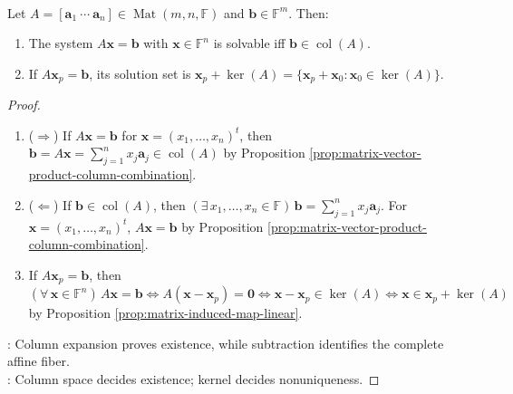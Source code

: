 \begin{proposition} \label{prop:linear-system-solvability-and-affine-solution-set} \\
Let $A=[\mathbf{a}_1\ \cdots\ \mathbf{a}_n]\in\operatorname{Mat}(m,n,\mathbb{F})$ and $\mathbf{b}\in\mathbb{F}^m$. Then:
\begin{enumerate}[label=(\roman*)]
\setlength{\itemsep}{0pt}
\item The system $A\mathbf{x}=\mathbf{b}$ with $\mathbf{x}\in\mathbb{F}^n$ is solvable iff $\mathbf{b}\in\operatorname{col}(A)$.
\item If $A\mathbf{x}_p=\mathbf{b}$, its solution set is $\mathbf{x}_p+\ker(A)=\{\mathbf{x}_p+\mathbf{x}_0:\mathbf{x}_0\in\ker(A)\}$.
\end{enumerate}
\begin{proof}
\begin{enumerate}[label=(\roman*)]
\setlength{\itemsep}{0pt}
\item[$(i)$] ($\Rightarrow$) If $A\mathbf{x}=\mathbf{b}$ for $\mathbf{x}=(x_1,\ldots,x_n)^t$, then $\mathbf{b}=A\mathbf{x}=\sum\limits_{j=1}^{n}x_j\mathbf{a}_j\in\operatorname{col}(A)$ by Proposition \ref{prop:matrix-vector-product-column-combination}.
\item[$(i)$] ($\Leftarrow$) If $\mathbf{b}\in\operatorname{col}(A)$, then $(\exists\,x_1,\ldots,x_n\in\mathbb{F})\,\mathbf{b}=\sum\limits_{j=1}^{n}x_j\mathbf{a}_j$. For $\mathbf{x}=(x_1,\ldots,x_n)^t$, $A\mathbf{x}=\mathbf{b}$ by Proposition \ref{prop:matrix-vector-product-column-combination}.
\item[$(ii)$] If $A\mathbf{x}_p=\mathbf{b}$, then $(\forall\,\mathbf{x}\in\mathbb{F}^n)\,A\mathbf{x}=\mathbf{b}\iff A(\mathbf{x}-\mathbf{x}_p)=\mathbf{0}\iff\mathbf{x}-\mathbf{x}_p\in\ker(A)\iff\mathbf{x}\in\mathbf{x}_p+\ker(A)$ by Proposition \ref{prop:matrix-induced-map-linear}.
\end{enumerate}
: Column expansion proves existence, while subtraction identifies the complete affine fiber.\\
: Column space decides existence; kernel decides nonuniqueness.
\end{proof}
\end{proposition}

